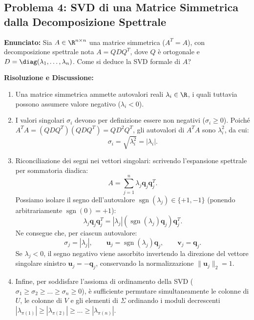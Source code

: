 \subsection{Problema 4: SVD di una Matrice Simmetrica dalla Decomposizione Spettrale}
\label{sec:svd-simmetrica-spettrale}

\begin{example}[Ricavo della SVD da Decomposizione Spettrale $A = Q D Q^T$]
\textbf{Enunciato:} Sia $A \in \R^{n \times n}$ una matrice simmetrica ($A^T = A$), con decomposizione spettrale nota $A = Q D Q^T$, dove $Q$ \`e ortogonale e $D = \diag(\lambda_1, \dots, \lambda_n)$. Come si deduce la SVD formale di $A$?

\medskip
\textbf{Risoluzione e Discussione:}
\begin{enumerate}
    \item Una matrice simmetrica ammette autovalori reali $\lambda_i \in \R$, i quali tuttavia possono assumere valore negativo ($\lambda_i < 0$).
    \item I valori singolari $\sigma_i$ devono per definizione essere non negativi ($\sigma_i \ge 0$). Poich\'e $A^T A = (Q D Q^T)(Q D Q^T) = Q D^2 Q^T$, gli autovalori di $A^T A$ sono $\lambda_i^2$, da cui:
    \begin{equation}
        \sigma_i = \sqrt{\lambda_i^2} = |\lambda_i|.
    \end{equation}
    \item Riconciliazione dei segni nei vettori singolari: scrivendo l'espansione spettrale per sommatoria diadica:
    \begin{equation}
        A = \sum_{j=1}^n \lambda_j \mathbf{q}_j \mathbf{q}_j^T.
    \end{equation}
    Possiamo isolare il segno dell'autovalore $\operatorname{sgn}(\lambda_j) \in \{+1, -1\}$ (ponendo arbitrariamente $\operatorname{sgn}(0) = +1$):
    \begin{equation}
        \lambda_j \mathbf{q}_j \mathbf{q}_j^T = |\lambda_j| \left( \operatorname{sgn}(\lambda_j) \mathbf{q}_j \right) \mathbf{q}_j^T.
    \end{equation}
    Ne consegue che, per ciascun autovalore:
    \begin{equation}
        \sigma_j = |\lambda_j|, \qquad \mathbf{u}_j = \operatorname{sgn}(\lambda_j) \mathbf{q}_j, \qquad \mathbf{v}_j = \mathbf{q}_j.
    \end{equation}
    Se $\lambda_j < 0$, il segno negativo viene assorbito invertendo la direzione del vettore singolare sinistro $\mathbf{u}_j = -\mathbf{q}_j$, conservando la normalizzazione $\|\mathbf{u}_j\|_2 = 1$.
    \item Infine, per soddisfare l'assioma di ordinamento della SVD ($\sigma_1 \ge \sigma_2 \ge \dots \ge \sigma_n \ge 0$), \`e sufficiente permutare simultaneamente le colonne di $U$, le colonne di $V$ e gli elementi di $\Sigma$ ordinando i moduli decrescenti $|\lambda_{\pi(1)}| \ge |\lambda_{\pi(2)}| \ge \dots \ge |\lambda_{\pi(n)}|$.
\end{enumerate}
\end{example}

